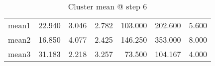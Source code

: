 \begin{table}[htbp]
  \centering
  \caption{Cluster mean @ step 6}
    \begin{tabular}{rrrrrrr}
    \toprule
    mean1 & 22.940  & 3.046  & 2.782  & 103.000  & 202.600  & 5.600  \\
    mean2 & 16.850  & 4.077  & 2.425  & 146.250  & 353.000  & 8.000  \\
    mean3 & 31.183  & 2.218  & 3.257  & 73.500  & 104.167  & 4.000  \\
    \bottomrule
    \end{tabular}%
  \label{tab:mean_b6}%
\end{table}%
